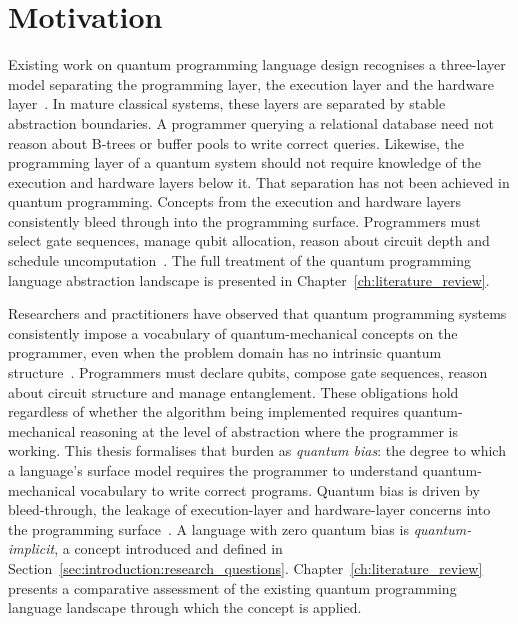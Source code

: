 \section{Motivation}\label{sec:introduction:motivation}
Existing work on quantum programming language design recognises a three-layer model separating the programming layer, the execution layer and the hardware layer~\cite{DiMatteo2024AbstractionHierarchy, nunez_corrales2025betterabstractmachines}.
In mature classical systems, these layers are separated by stable abstraction boundaries.
A programmer querying a relational database need not reason about B-trees or buffer pools to write correct queries.
Likewise, the programming layer of a quantum system should not require knowledge of the execution and hardware layers below it.
That separation has not been achieved in quantum programming.
Concepts from the execution and hardware layers consistently bleed through into the programming surface.
Programmers must select gate sequences, manage qubit allocation, reason about circuit depth and schedule uncomputation~\cite{DiMatteo2024AbstractionHierarchy}.
The full treatment of the quantum programming language abstraction landscape is presented in Chapter~\ref{ch:literature_review}.

Researchers and practitioners have observed that quantum programming systems consistently impose a vocabulary of quantum-mechanical concepts on the programmer, even when the problem domain has no intrinsic quantum structure~\cite{Gay2006QPLSurvey, DiMatteo2024AbstractionHierarchy, ferreira2024qplusage}.
Programmers must declare qubits, compose gate sequences, reason about circuit structure and manage entanglement.
These obligations hold regardless of whether the algorithm being implemented requires quantum-mechanical reasoning at the level of abstraction where the programmer is working.
This thesis formalises that burden as \textit{quantum bias}: the degree to which a language's surface model requires the programmer to understand quantum-mechanical vocabulary to write correct programs.
Quantum bias is driven by bleed-through, the leakage of execution-layer and hardware-layer concerns into the programming surface~\cite{DiMatteo2024AbstractionHierarchy}.
A language with zero quantum bias is \textit{quantum-implicit}, a concept introduced and defined in Section~\ref{sec:introduction:research_questions}.
Chapter~\ref{ch:literature_review} presents a comparative assessment of the existing quantum programming language landscape through which the concept is applied.

